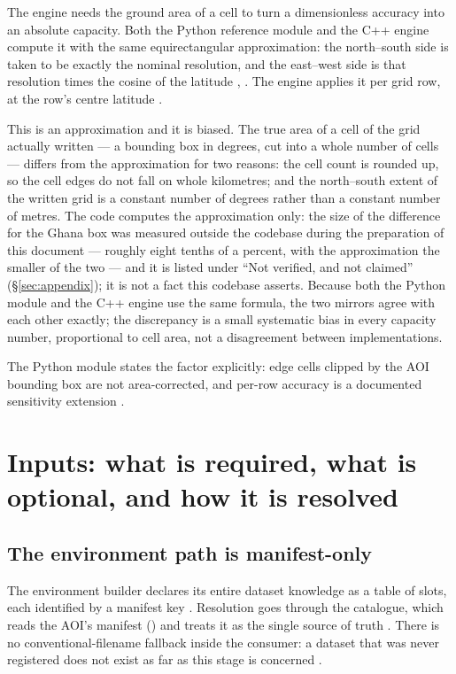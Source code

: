 \documentclass[11pt,a4paper]{article} \usepackage[utf8]{inputenc} \usepackage{lmodern} \usepackage[T1]{fontenc}
\begin{document}
The engine needs the ground area of a cell to turn a dimensionless accuracy into an absolute
capacity. Both the Python reference module and the C++ engine compute it with the same
equirectangular approximation: the north--south side is taken to be exactly the nominal
resolution, and the east--west side is that resolution times the cosine of the latitude
,
. The
engine applies it per grid row, at the row's centre latitude
.

This is an approximation and it is biased. The true area of a cell of the grid actually written
--- a bounding box in degrees, cut into a whole number of cells --- differs from the
approximation for two reasons: the cell count is rounded up, so the cell edges do not fall on
whole kilometres; and the north--south extent of the written grid is a constant number of
degrees rather than a constant number of metres. The code computes the approximation only: the
size of the difference for the Ghana box was measured outside the codebase during the
preparation of this document --- roughly eight tenths of a percent, with the approximation the
smaller of the two --- and it is listed under ``Not verified, and not claimed''
(\S\ref{sec:appendix}); it is not a fact this codebase asserts. Because both the Python module
and the C++ engine use the same formula, the two mirrors agree with each other exactly; the
discrepancy is a small systematic bias in every capacity number, proportional to cell area, not
a disagreement between implementations.

The Python module states the factor explicitly: edge cells clipped by the AOI bounding box are
not area-corrected, and per-row accuracy is a documented sensitivity extension
.

\section{Inputs: what is required, what is optional, and how it is resolved}
\label{sec:envinputs}

\subsection{The environment path is manifest-only}

The environment builder declares its entire dataset knowledge as a table of slots, each
identified by a manifest key . Resolution
goes through the catalogue, which reads the AOI's manifest () and treats it
as the single source of truth . There
is no conventional-filename fallback inside the consumer: a dataset that was never registered
does not exist as far as this stage is concerned
.
\end{document}
